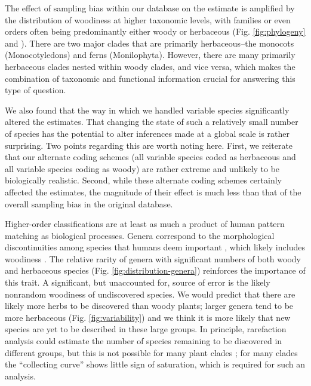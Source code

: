 The effect of sampling bias within our database on the estimate is
amplified by the distribution of woodiness at higher taxonomic levels,
with families or even orders often being predominantly either woody or
herbaceous (Fig. \ref{fig:phylogeny} and
\citealt{sinnott1915evolution}).  There are two major clades that are
primarily herbaceous--the monocots (Monocotyledons) and ferns
(Monilophyta). However, there are many primarily herbaceous clades
nested within woody clades, and vice versa, which makes the
combination of taxonomic and functional information crucial for
answering this type of question.

We also found that the way in which we handled variable species
significantly altered the estimates. That changing the state of such a
relatively small number of species has the potential to alter
inferences made at a global scale is rather surprising. Two points
regarding this are worth noting here. First, we reiterate that our
alternate coding schemes (all variable species coded as herbaceous and
all variable species coding as woody) are rather extreme and unlikely
to be biologically realistic. Second, while these alternate coding
schemes certainly affected the estimates, the magnitude of their
effect is much less than that of the overall sampling bias in the
original database.

Higher-order classifications are at least as much a product of human
pattern matching as biological processes.  Genera correspond to the
morphological discontinuities among species that humans deem important
\citep{scotland2004significance}, which likely includes woodiness
\citep[e.g.,][]{Hutchinson}.  The relative rarity of genera with
significant numbers of both woody and herbaceous species (Fig.
\ref{fig:distribution-genera}) reinforces the importance of this
trait.  A significant, but unaccounted for, source of error is the
likely nonrandom woodiness of undiscovered species. We would predict
that there are likely more herbs to be discovered than woody plants;
larger genera tend to be more herbaceous (Fig. \ref{fig:variability}) and we
think it is more likely that new species are yet to be described in
these large groups.  In principle, rarefaction analysis could estimate
the number of species remaining to be discovered in different groups,
but this is not possible for many plant clades \citep{costello2011};
for many clades the ``collecting curve'' shows little sign of
saturation, which is required for such an analysis.

